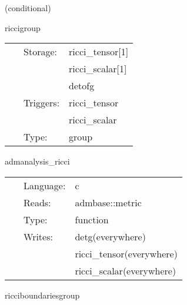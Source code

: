 \documentclass{article}
\begin{document}
\vspace{5mm}

   (conditional) 

\hspace{5mm} riccigroup 

\hspace{5mm}{\it calculate ricci tensor, with boundary conditions } 


\hspace{5mm}

 \begin{tabular*}{160mm}{cll} 
~ & Storage:  & ricci\_tensor[1] \\ 
~& ~ &ricci\_scalar[1]\\ 
~& ~ &detofg\\ 
~ & Triggers:  & ricci\_tensor \\ 
~& ~ &ricci\_scalar\\ 
~ & Type:  & group \\ 
\end{tabular*} 


\vspace{5mm}


\hspace{5mm} admanalysis\_ricci 

\hspace{5mm}{\it calculate ricci tensor, with boundary conditions } 


\hspace{5mm}

 \begin{tabular*}{160mm}{cll} 
~ & Language:  & c \\ 
~ & Reads:  & admbase::metric \\ 
~ & Type:  & function \\ 
~ & Writes:  & detg(everywhere) \\ 
~& ~ &ricci\_tensor(everywhere)\\ 
~& ~ &ricci\_scalar(everywhere)\\ 
\end{tabular*} 


\vspace{5mm}


\hspace{5mm} ricciboundariesgroup 

\hspace{5mm}{\it set ricci tensor on the boundary } 
\end{document}
